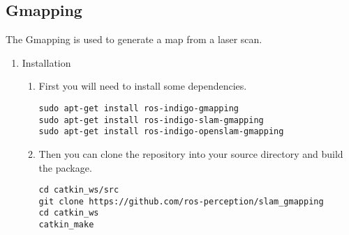 \documentclass{article}
\begin{document}
\subsection{Gmapping}
The Gmapping is used to generate a map from a laser scan.
\begin{enumerate}

\item Installation
\begin{enumerate}
\item First you will need to install some dependencies.
\begin{lstlisting}
sudo apt-get install ros-indigo-gmapping
sudo apt-get install ros-indigo-slam-gmapping
sudo apt-get install ros-indigo-openslam-gmapping
\end{lstlisting}
\item Then you can clone the repository into your source directory and build the
package.
\begin{lstlisting}
cd catkin_ws/src
git clone https://github.com/ros-perception/slam_gmapping
cd catkin_ws
catkin_make
\end{lstlisting}
\end{enumerate}


\end{enumerate}
\end{document}
